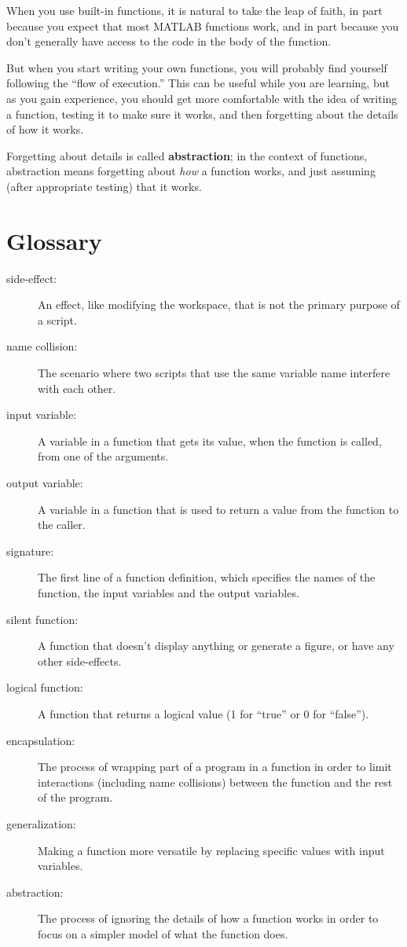 \documentclass[
]{book}
\begin{document}
When you use built-in functions, it is natural to take the leap
of faith, in part because you expect that most
MATLAB functions work, and in part because you don't
generally have access to the code in the body of the function.

But when you start writing your own functions, you will probably
find yourself following the ``flow of execution.''  This can
be useful while you are learning, but as you gain experience, you
should get more comfortable with the idea of writing a function,
testing it to make sure it works, and then forgetting about the
details of how it works.

Forgetting about details is called {\bf abstraction}; in the context
of functions, abstraction means forgetting about {\em how} a function
works, and just assuming (after appropriate testing) that it works.


\section{Glossary}

\begin{description}

\item[side-effect:] An effect, like modifying the workspace, that
is not the primary purpose of a script.

\item[name collision:] The scenario where two scripts that use the
same variable name interfere with each other.

\item[input variable:] A variable in a function that gets its value,
when the function is called, from one of the arguments.

\item[output variable:] A variable in a function that is used to
return a value from the function to the caller.

\item[signature:] The first line of a function definition, which
specifies the names of the function, the input variables and the
output variables.

\item[silent function:] A function that doesn't display anything
or generate a figure, or have any other side-effects.

\item[logical function:] A function that returns a logical value
(1 for ``true'' or 0 for ``false'').

\item[encapsulation:] The process of wrapping part of a program in
a function in order to limit interactions (including name collisions)
between the function and the rest of the program.

\item[generalization:] Making a function more versatile by replacing
specific values with input variables.

\item[abstraction:] The process of ignoring the details of how
a function works in order to focus on a simpler model of what the
function does.

\end{description}
\end{document}
